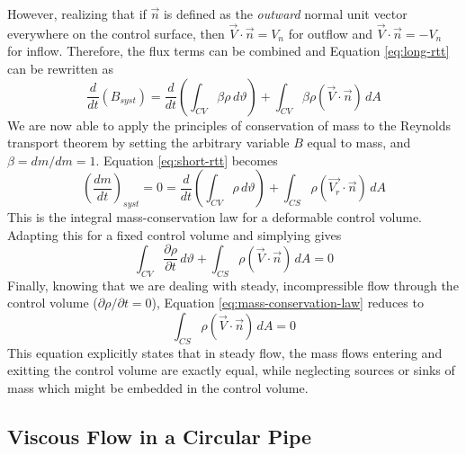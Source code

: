 \documentclass[11pt]{article} %
\numberwithin{equation}{section} %
\begin{document}
However, realizing that if $\vec{n}$ is defined as the \textit{outward} normal unit vector everywhere on the control surface, then $\vec{V} \cdot \vec{n} = V_{n}$ for outflow and $\vec{V} \cdot \vec{n} = -V_{n}$ for inflow. Therefore, the flux terms can be combined and Equation \ref{eq:long-rtt} can be rewritten as
\begin{equation} \label{eq:short-rtt}
\frac{d}{dt}(B_{syst}) = \frac{d}{dt} \left( \int_{CV} \beta \rho\, d\vartheta \right) + \int_{CV} \beta \rho(\vec{V} \cdot \vec{n})\, dA
\end{equation}
We are now able to apply the principles of conservation of mass to the Reynolds transport theorem by setting the arbitrary variable $B$ equal to mass, and $\beta = dm/dm =1$. Equation \ref{eq:short-rtt} becomes
\begin{equation}
\left( \frac{dm}{dt} \right)_{syst} = 0 = \frac{d}{dt} \left( \int_{CV} \rho\, d\vartheta \right) + \int_{CS} \rho(\vec{V_{r}} \cdot \vec{n})\, dA
\end{equation}
This is the integral mass-conservation law for a deformable control volume. Adapting this for a fixed control volume and simplying gives
\begin{equation} \label{eq:mass-conservation-law}
\int_{CV} \frac{\partial \rho}{\partial t}\, d\vartheta + \int_{CS} \rho(\vec{V} \cdot \vec{n})\, dA = 0
\end{equation}
Finally, knowing that we are dealing with steady, incompressible flow through the control volume ($\partial \rho/ \partial t = 0$), Equation \ref{eq:mass-conservation-law} reduces to
\begin{equation} \label{eq:continuity-relation}
\int_{CS} \rho(\vec{V} \cdot \vec{n})\, dA = 0
\end{equation}
This equation explicitly states that in steady flow, the mass flows entering and exitting the control volume are exactly equal, while neglecting sources or sinks of mass which might be embedded in the control volume.

\subsection{Viscous Flow in a Circular Pipe}
\end{document}
